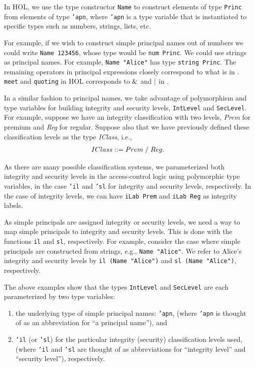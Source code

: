 In HOL, we use the type constructor \texttt{Name} to construct
elements of type \texttt{Princ} from elements of type \texttt{'apn},
where \texttt{'apn} is a type variable that is instantiated to
specific types such as numbers, strings, lists, etc.

For example, if we wish to construct simple principal names out of
numbers we could write \texttt{Name 123456}, whose type would be
\texttt{num Princ}. We could use strings as principal names. For
example, \texttt{Name "Alice"} has type \texttt{string Princ}.  The
remaining operators in principal expressions closely correspond to
what is in \cite{ACST}.  \texttt{meet} and \texttt{quoting} in HOL
corresponds to $\&$ and $\mid$ in \cite{ACST}.

In a similar fashion to principal names, we take advantage of
polymorphism and type variables for building integrity and security
levels, \texttt{IntLevel} and \texttt{SecLevel}.  For example, suppose
we have an integrity classification with two levels, \emph{Prem} for
premium and \emph{Reg} for regular. Suppose also that we have
previously defined these classification levels as the type
\emph{IClass}, i.e.,
\begin{gather*}
  IClass ::= Prem \;/\; Reg.
\end{gather*}

As there are many possible classification systems, we parameterized
both integrity and security levels in the access-control logic using
polymorphic type variables, in the case \texttt{'il} and
\texttt{'sl} for integrity and security levels, respectively. In the
case of integrity levels, we can have \texttt{iLab Prem} and
\texttt{iLab Reg} as integrity labels.

As simple principals are assigned integrity or security levels, we
need a way to map simple principals to integrity and security levels.
This is done with the functions \texttt{il} and \texttt{sl},
respectively.  For example, consider the case where simple principals
are constructed from strings, e.g., \texttt{Name "Alice"}. We refer
to Alice's integrity and security levels by \texttt{il (Name
  "Alice")} and \texttt{sl (Name "Alice")}, respectively.

The above examples show that the types \texttt{IntLevel} and
\texttt{SecLevel} are each parameterized by two type variables:
\begin{enumerate}
\item the underlying type of simple principal names: \texttt{'apn},
  (where \texttt{'apn} is thought of as an abbreviation for ``a
  principal name''), and
\item \texttt{'il} (or \texttt{'sl}) for the particular integrity
  (security) classification levels used, (where \texttt{'il} and
  \texttt{'sl} are thought of as abbreviations for ``integrity
  level'' and ``security level''), respectively.
\end{enumerate}

